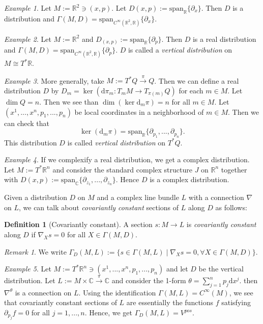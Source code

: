 \documentclass[11pt]{amsart}
\numberwithin{equation}{section}
\theoremstyle{plain}
\theoremstyle{definition}
\newtheorem{defn}{Definition}[subsection]
\theoremstyle{remark}
\newtheorem{rem}{Remark}[subsection]
\newtheorem{ex}{Example}[subsection]
\newcommand{\R}{\mathbb{R}}
\newcommand{\dd}{{\mathrm{d}}}
\begin{document}
\begin{ex}
Let $M:=\R^2\ni(x,p)$. Let $D(x,p):=\mathrm{span}_\R\{\partial_x\}$. Then $D$ is a distribution and $\Gamma(M,D)=\mathrm{span}_{C^\infty(\R^2,\R)}\{\partial_x\}$.
\end{ex}

\begin{ex}
Let $M:=\R^2$ and $D_{(x,p)}:=\mathrm{span}_\R\{\partial_p\}$. Then $D$ is a real distribution and $\Gamma(M,D)=\mathrm{span}_{C^\infty(\R^2,\R)}\{\partial_p\}$. $D$ is called a \emph{vertical distribution} on $M\cong T^*\R$. 
\end{ex}

\begin{ex}
More generally, take $M:=T^*Q\xrightarrow{\pi}Q$. Then we can define a real distribution $D$ by $D_m=\ker(\dd\pi_m\colon T_mM\to T_{\pi(m)}Q)$ for each $m\in M$. Let $\dim Q=n$. Then we see than $\dim (\ker\dd_m\pi)=n$ for all $m\in M$. Let $(x^1,...,x^n,p_1,...,p_n)$ be local coordinates in a neighborhood of $m\in M$. Then we can check that $$\ker(\dd_m\pi)=\mathrm{span}_\R\{\partial_{p_1},...,\partial_{p_n}\}.$$ This distribution $D$ is called \emph{vertical distribution} on $T^*Q$.
\end{ex}

\begin{ex}
If we complexify a real distribution, we get a complex distribution. Let $M:=T^*\R^n$ and consider the standard complex structure $J$ on $\R^n$ together with $D(x,p):=\mathrm{span}_\mathbb{C}\{\partial_{z_1},...,\partial_{z_n}\}$. Hence $D$ is a complex distribution. 
\end{ex}

Given a distribution $D$ on $M$ and a complex line bundle $L$ with a connection $\nabla$ on $L$, we can talk about \emph{covariantly constant} sections of $L$ along $D$ as follows:

\begin{defn}[Covariantly constant]
A section $s\colon M\to L$ is \emph{covariantly constant} along $D$ if $\nabla_Xs=0$ for all $X\in \Gamma(M,D)$.
\end{defn}

\begin{rem}
We write $\Gamma_D(M,L):=\{s\in\Gamma(M,L)\mid \nabla_Xs=0,\forall X\in\Gamma(M,D)\}$.
\end{rem}

\begin{ex}
\label{ex:example1}
Let $M:=T^*\R^n\ni (x^1,...,x^n,p_1,...,p_n)$ and let $D$ be the vertical distribution. Let $L:=M\times\mathbb{C}\xrightarrow{\pi}\mathbb{C}$ and consider the 1-form $\theta=\sum_{j=1}^np_j\dd x^j$. then $\nabla^\theta$ is a connection on $L$. Using the identification $\Gamma(M,L)=C^\infty(M)$, we see that covariantly constant sections of $L$ are essentially the functions $f$ satisfying $\partial_{p_j}f=0$ for all $j=1,...,n$. Hence, we get $\Gamma_D(M,L)= V^{pos}$.
\end{ex}
\end{document}
